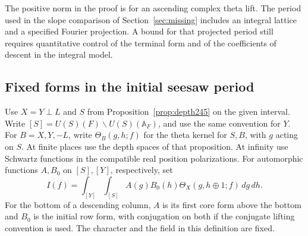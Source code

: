 \documentclass[a4paper,11pt]{article}
\theoremstyle{definition}
\theoremstyle{remark}
\numberwithin{equation}{section}
\begin{document}
The positive norm in the proof is for an ascending complex
theta lift. The period used in the slope comparison of
Section~\ref{sec:missing} includes an integral lattice and
a specified Fourier projection. A bound for that projected
period still requires quantitative control of the terminal
form and of the coefficients of descent in the integral model.

\subsection{Fixed forms in the initial seesaw period}\label{nav:VIII-36}
Use \(X=Y\perp L\) and \(S\) from Proposition~\ref{prop:depth245}
on the given interval. Write \([S]=U(S)(F)\backslash U(S)(\mathbb A_F)\),
and use the same convention for \(Y\). For \(B=X,Y,-L\), write
\(\Theta_B(g,h;f)\) for the theta kernel for \(S,B\), with \(g\)
acting on \(S\). At finite places use the depth spaces of that
proposition. At infinity use Schwartz functions in the compatible
real position polarizations. For automorphic functions \(A,B_0\) on
\([S],[Y]\), respectively, set
\[
 I(f)=\int_{[Y]}\int_{[S]} A(g) B_0(h)
                \Theta_X(g,h\oplus1;f)\,dg\,dh .
\]
For the bottom of a descending column, \(A\) is its first core form
above the bottom and \(B_0\) is the initial row form, with conjugation
on both if the conjugate lifting convention is used. The character
and the field in this definition are fixed.
\end{document}
